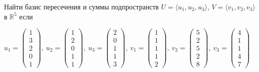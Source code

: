\documentclass[12pt]{article}
\newenvironment{problem}[2][Problem]
{\begin{trivlist}\item[{\bfseries #1} {\bfseries #2.}]}{\end{trivlist}}
\begin{document}
\begin{problem}{3} 
Найти базис пересечения и суммы подпространств $U=\langle u_1, u_2, u_3\rangle$, $V=\langle v_1, v_2, v_3\rangle$ в $\mathds{R}^5$ если 
\begin{center}
$
u_1=
\begin{pmatrix}
1\\
3\\
2\\
0\\
1
\end{pmatrix},\ 
u_2=
\begin{pmatrix}
1\\
2\\
0\\
1\\
1
\end{pmatrix},\ 
u_3=
\begin{pmatrix}
2\\
0\\
1\\
1\\
3
\end{pmatrix},\ 
v_1=
\begin{pmatrix}
1\\
1\\
1\\
1\\
2
\end{pmatrix},\ 
v_2=
\begin{pmatrix}
5\\
2\\
5\\
2\\
8
\end{pmatrix},\ 
v_3=
\begin{pmatrix}
4\\
1\\
1\\
4\\
7
\end{pmatrix}
$
\end{center}
\end{problem}
\end{document}
